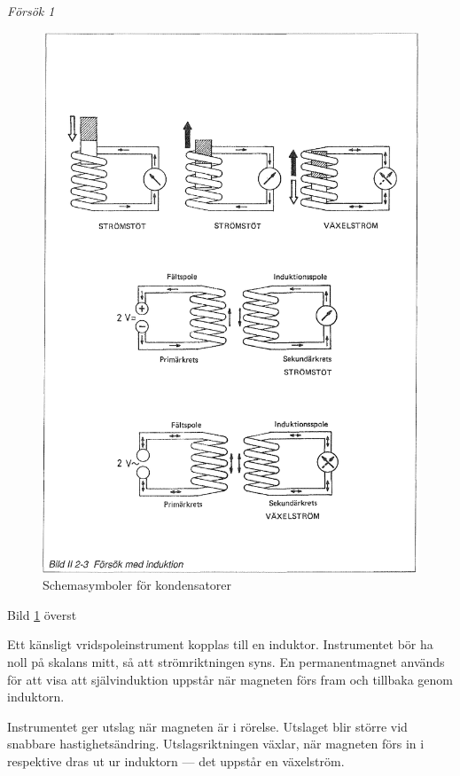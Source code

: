 \emph{Försök 1}

\begin{figure}
\includegraphics[width=\textwidth]{images/bild_2_2-03}
\caption{Schemasymboler för kondensatorer}
\label{fig:BildII2-3}
\end{figure}

Bild \ref{fig:BildII2-3} överst

Ett känsligt vridspoleinstrument kopplas till en induktor. Instrumentet bör ha
noll på skalans mitt, så att strömriktningen syns. En permanentmagnet används
för att visa att självinduktion uppstår när magneten förs fram och tillbaka
genom induktorn.

Instrumentet ger utslag när magneten är i rörelse. Utslaget blir större vid
snabbare hastighetsändring. Utslagsriktningen växlar, när magneten förs in i
respektive dras ut ur induktorn --- det uppstår en växelström.

